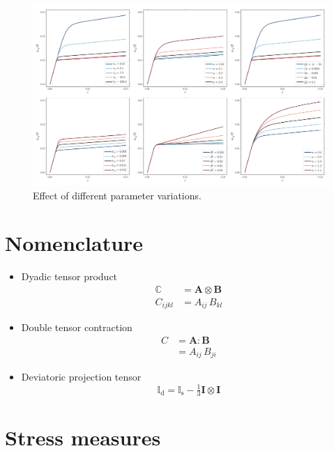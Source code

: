 \documentclass[times,namecite]{goose-article}
\begin{document}
\begin{figure}[htp]
  \centering
  \includegraphics[width=1.\textwidth]{figures/parameters}
  \caption{Effect of different parameter variations.}
  \label{fig:parameter}
\end{figure}

\appendix
\vfill\newpage

\section{Nomenclature}
\label{sec:nomenclature}

\begin{itemize}
%
\item Dyadic tensor product
\begin{align}
  \mathbb{C} &= \bm{A} \otimes \bm{B} \\
  C_{ijkl}   &= A_{ij} \,      B_{kl}
\end{align}
%
\item Double tensor contraction
\begin{align}
  C &= \bm{A} : \bm{B} \\
    &= A_{ij} \, B_{ji}
\end{align}
%
\item Deviatoric projection tensor
%
\begin{equation}
  \mathbb{I}_\mathrm{d}
  = \mathbb{I}_\mathrm{s} - \tfrac{1}{3} \bm{I} \otimes \bm{I}
\end{equation}
%
\end{itemize}

\section{Stress measures}
\label{sec:ap:stress}
\end{document}
